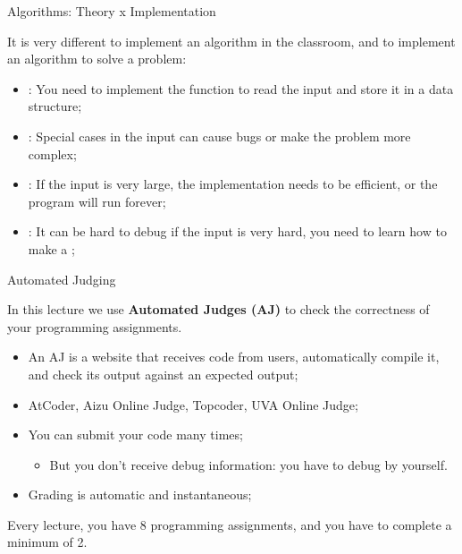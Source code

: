 \begin{frame}{Algorithms: Theory x Implementation}
  \begin{exampleblock}{}
  It is very different to implement an algorithm in the classroom, and to implement an algorithm to solve a problem:
  \end{exampleblock}
  \begin{itemize}
    \item {}: You need to implement the function to read the input and store it in a data structure;
    \item {}: Special cases in the input can cause bugs or make the problem more complex;
    \item {}: If the input is very large, the implementation
    needs to be efficient, or the program will run forever;
    \item {}: It can be hard to debug if the input is very hard, you need to learn how to make a ;
  \end{itemize}
\end{frame}

\begin{frame}{Automated Judging}
  \begin{exampleblock}{}
  In this lecture we use {\bf Automated Judges (AJ)} to check the correctness of your programming assignments.
  \end{exampleblock}

  \begin{itemize}
    \item An AJ is a website that receives code from users, automatically compile it, and check its output against an expected output;
    \item AtCoder, Aizu Online Judge, Topcoder, UVA Online Judge;
    \item You can submit your code many times;
    \begin{itemize}
      \item But you don't receive debug information: you have to debug by yourself.
    \end{itemize}
    \item Grading is automatic and instantaneous;
  \end{itemize}
  \bigskip

  \begin{exampleblock}{}
  Every lecture, you have 8 programming assignments, and you have to complete a minimum of 2.
  \end{exampleblock}
\end{frame}

